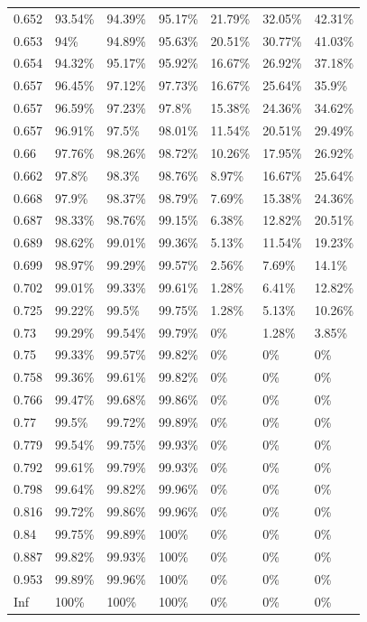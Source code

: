 \documentclass[a4paper,titlepage]{ppgi}\usepackage[]{graphicx}\usepackage[]{color}
\begin{document}
\begin{longtable}{l l l l l l l}
0.652 & 93.54\% & 94.39\% & 95.17\% & 21.79\% & 32.05\% & 42.31\% \\
0.653 & 94\% & 94.89\% & 95.63\% & 20.51\% & 30.77\% & 41.03\% \\
0.654 & 94.32\% & 95.17\% & 95.92\% & 16.67\% & 26.92\% & 37.18\% \\
0.657 & 96.45\% & 97.12\% & 97.73\% & 16.67\% & 25.64\% & 35.9\% \\
0.657 & 96.59\% & 97.23\% & 97.8\% & 15.38\% & 24.36\% & 34.62\% \\
0.657 & 96.91\% & 97.5\% & 98.01\% & 11.54\% & 20.51\% & 29.49\% \\
0.66 & 97.76\% & 98.26\% & 98.72\% & 10.26\% & 17.95\% & 26.92\% \\
0.662 & 97.8\% & 98.3\% & 98.76\% & 8.97\% & 16.67\% & 25.64\% \\
0.668 & 97.9\% & 98.37\% & 98.79\% & 7.69\% & 15.38\% & 24.36\% \\
0.687 & 98.33\% & 98.76\% & 99.15\% & 6.38\% & 12.82\% & 20.51\% \\
0.689 & 98.62\% & 99.01\% & 99.36\% & 5.13\% & 11.54\% & 19.23\% \\
0.699 & 98.97\% & 99.29\% & 99.57\% & 2.56\% & 7.69\% & 14.1\% \\
0.702 & 99.01\% & 99.33\% & 99.61\% & 1.28\% & 6.41\% & 12.82\% \\
0.725 & 99.22\% & 99.5\% & 99.75\% & 1.28\% & 5.13\% & 10.26\% \\
0.73 & 99.29\% & 99.54\% & 99.79\% & 0\% & 1.28\% & 3.85\% \\
0.75 & 99.33\% & 99.57\% & 99.82\% & 0\% & 0\% & 0\% \\
0.758 & 99.36\% & 99.61\% & 99.82\% & 0\% & 0\% & 0\% \\
0.766 & 99.47\% & 99.68\% & 99.86\% & 0\% & 0\% & 0\% \\
0.77 & 99.5\% & 99.72\% & 99.89\% & 0\% & 0\% & 0\% \\
0.779 & 99.54\% & 99.75\% & 99.93\% & 0\% & 0\% & 0\% \\
0.792 & 99.61\% & 99.79\% & 99.93\% & 0\% & 0\% & 0\% \\
0.798 & 99.64\% & 99.82\% & 99.96\% & 0\% & 0\% & 0\% \\
0.816 & 99.72\% & 99.86\% & 99.96\% & 0\% & 0\% & 0\% \\
0.84 & 99.75\% & 99.89\% & 100\% & 0\% & 0\% & 0\% \\
0.887 & 99.82\% & 99.93\% & 100\% & 0\% & 0\% & 0\% \\
0.953 & 99.89\% & 99.96\% & 100\% & 0\% & 0\% & 0\% \\
Inf & 100\% & 100\% & 100\% & 0\% & 0\% & 0\% \\
\end{longtable}
\end{document}
